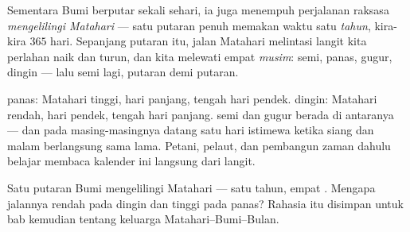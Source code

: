 \begin{definition}\label{def:g3:sun-days-seasons:year}
Sementara Bumi berputar sekali sehari, ia juga menempuh perjalanan
raksasa \emph{mengelilingi Matahari} --- satu putaran penuh memakan
waktu satu \emph{tahun}, kira-kira $365$ hari. Sepanjang
putaran itu, jalan Matahari melintasi langit kita perlahan naik dan
turun, dan kita melewati empat \emph{musim}: semi, panas,
gugur, dingin --- lalu semi lagi, putaran demi putaran.
\end{definition}

\begin{example}\label{ex:g3:sun-days-seasons:quarters}
 panas: Matahari tinggi, hari panjang,  tengah hari
pendek.  dingin: Matahari rendah, hari pendek, 
tengah hari panjang.  semi dan  gugur berada di antaranya
--- dan pada masing-masingnya datang satu hari istimewa ketika siang
dan malam berlangsung sama lama. Petani, pelaut, dan pembangun zaman
dahulu belajar membaca kalender ini langsung dari langit.
\end{example}

\begin{omfigure}

{\small Satu putaran Bumi mengelilingi Matahari --- satu tahun, empat
. Mengapa jalannya rendah pada  dingin dan tinggi pada 
panas? Rahasia itu disimpan untuk bab kemudian tentang keluarga
Matahari--Bumi--Bulan.}
\end{omfigure}

